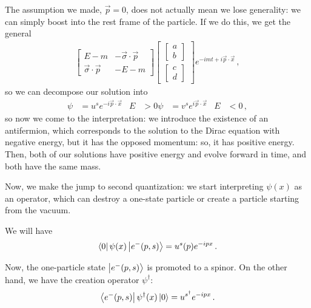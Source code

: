 \documentclass[main.tex]{subfiles}
\begin{document}
The assumption we made, \(\vec{p} = 0\), does not actually mean we lose generality: we can simply boost into the rest frame of the particle.
If we do this, we get the general 
%
\begin{subequations}
\begin{align}
\left[\begin{array}{cc}
E-m & - \vec{\sigma} \cdot \vec{p} \\ 
\vec{\sigma} \cdot \vec{p} & -E-m
\end{array}\right]
\left[\begin{array}{c}
\left[\begin{array}{c}
a \\ 
b
\end{array}\right] \\ 
\left[\begin{array}{c}
c \\ 
d
\end{array}\right]
\end{array}\right]
e^{-imt + i \vec{p} \cdot \vec{x}}
\,,
\end{align}
\end{subequations}
%
so we can decompose our solution into 
%
\begin{align}
\psi &= u^{s} e^{-i \vec{p} \cdot \vec{x}} & E&>0
\psi &= v^{s} e^{i \vec{p} \cdot \vec{x}} & E&<0
\,,
\end{align}
%
so now we come to the interpretation: we introduce the existence of an antifermion, which corresponds to the solution to the Dirac equation with negative energy, but it has the opposed momentum: so, it has positive energy.
Then, both of our solutions have positive energy and evolve forward in time, and both have the same mass. 

Now, we make the jump to second quantization: we start interpreting \(\psi (x) \) as an operator, which can destroy a one-state particle or create a particle starting from the vacuum. 

We will have 
%
\begin{align}
\bra{0} \psi (x) \ket{e^{-}(p,s)} = u^{s} (p) e^{-ipx}
\,.
\end{align}

Now, the one-particle state \(\ket{e^{-}(p, s)}\) is promoted to a spinor. 
On the other hand, we have the creation operator \(\psi ^\dag\): 
%
\begin{align}
\bra{e^{-}(p,s)} \psi ^\dag (x) \ket{0} = u^{s ^\dag} e^{-ipx}
\,.
\end{align}
\end{document}
